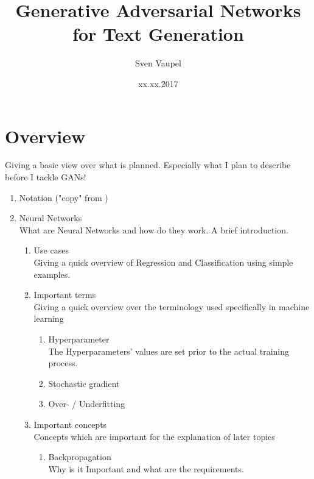 \documentclass[12pt]{article}
\title{\textbf{Generative Adversarial Networks for Text Generation}}
\author{Sven Vaupel}
\date{xx.xx.2017}
\begin{document}
\maketitle
\setlength{\parindent}{0cm}

\section{Overview}

Giving a basic view over what is planned. Especially what I plan to describe before I tackle GANs!

\begin{enumerate}
  \item Notation ("copy" from \cite{2})

  \item Neural Networks \\
    What are Neural Networks and how do they work. A brief introduction.

  \begin{enumerate}

    \item Use cases \\
      Giving a quick overview of Regression and Classification using simple examples.

    \item Important terms \\
      Giving a quick overview over the terminology used specifically in machine learning

      \begin{enumerate}

        \item Hyperparameter \\
          The Hyperparameters' values are set prior to the actual training process.

        \item Stochastic gradient

        \item Over- / Underfitting

      \end{enumerate}

    \item Important concepts \\
      Concepts which are important for the explanation of later topics

    \begin{enumerate}

      \item Backpropagation \\
        Why is it Important and what are the requirements.


\end{enumerate}
\end{enumerate}
\end{enumerate}
\end{document}

